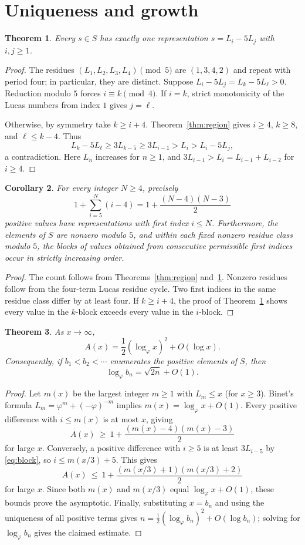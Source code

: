\documentclass[11pt]{article}
\newtheorem{theorem}{Theorem}
\newtheorem{corollary}[theorem]{Corollary}
\begin{document}
\section*{Uniqueness and growth}
\begin{theorem}\label{thm:unique}
Every $s\in S$ has exactly one representation $s=L_i-5L_j$ with $i,j\ge1$.
\end{theorem}
\begin{proof}
The residues $(L_1,L_2,L_3,L_4)\pmod5$ are $(1,3,4,2)$ and repeat with period four; in particular, they are distinct. Suppose
$L_i-5L_j=L_k-5L_\ell>0$.
Reduction modulo $5$ forces $i\equiv k\pmod4$. If $i=k$, strict monotonicity of the Lucas numbers from index $1$ gives $j=\ell$.

Otherwise, by symmetry take $k\ge i+4$. Theorem~\ref{thm:region} gives $i\ge4$, $k\ge8$, and $\ell\le k-4$. Thus
\[
 L_k-5L_\ell\ge 3L_{k-5}\ge3L_{i-1}>L_i>L_i-5L_j,
\]
a contradiction. Here $L_n$ increases for $n\ge1$, and $3L_{i-1}>L_i=L_{i-1}+L_{i-2}$ for $i\ge4$.
\end{proof}

\begin{corollary}\label{cor:finite}
For every integer $N\ge4$, precisely
\[
 1+\sum_{i=5}^N(i-4)=1+\frac{(N-4)(N-3)}2
\]
positive values have representations with first index $i\le N$.
Furthermore, the elements of $S$ are nonzero modulo $5$, and within each fixed nonzero residue class modulo $5$, the blocks of values obtained from consecutive permissible first indices occur in strictly increasing order.
\end{corollary}
\begin{proof}
The count follows from Theorems~\ref{thm:region} and~\ref{thm:unique}. Nonzero residues follow from the four-term Lucas residue cycle. Two first indices in the same residue class differ by at least four. If $k\ge i+4$, the proof of Theorem~\ref{thm:unique} shows every value in the $k$-block exceeds every value in the $i$-block.
\end{proof}

\begin{theorem}\label{thm:asymptotic}
As $x\to\infty$,
\[
 A(x)=\frac12(\log_\varphi x)^2+O(\log x).
\]
Consequently, if $b_1<b_2<\cdots$ enumerates the positive elements of $S$, then
\[
 \log_\varphi b_n=\sqrt{2n}+O(1).
\]
\end{theorem}
\begin{proof}
Let $m(x)$ be the largest integer $m\ge1$ with $L_m\le x$ (for $x\ge3$). Binet's formula
$L_m=\varphi^m+(-\varphi)^{-m}$ implies
$m(x)=\log_\varphi x+O(1)$.
Every positive difference with $i\le m(x)$ is at most $x$, giving
\[
 A(x)\ \ge\ 1+\frac{(m(x)-4)(m(x)-3)}2
\]
for large $x$. Conversely, a positive difference with $i\ge5$ is at least $3L_{i-5}$ by \eqref{eq:block}, so $i\le m(x/3)+5$. This gives
\[
 A(x)\ \le\ 1+\frac{(m(x/3)+1)(m(x/3)+2)}2
\]
for large $x$. Since both $m(x)$ and $m(x/3)$ equal $\log_\varphi x+O(1)$, these bounds prove the asymptotic. Finally, substituting $x=b_n$ and using the uniqueness of all positive terms gives
$n=\frac12(\log_\varphi b_n)^2+O(\log b_n)$; solving for $\log_\varphi b_n$ gives the claimed estimate.
\end{proof}
\end{document}
